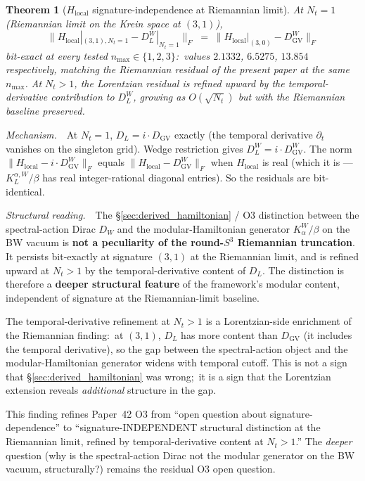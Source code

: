 \documentclass[11pt,a4paper]{article}
\theoremstyle{plain}
\newtheorem{theorem}{Theorem}[section]
\theoremstyle{definition}
\newcommand{\sthree}{S^{3}}
\begin{document}
\begin{theorem}[$H_{\mathrm{local}}$ signature-independence at Riemannian limit]
\label{thm:h_local_sig_independent}
At $N_t = 1$ (Riemannian limit on the Krein space at $(3, 1)$),
\[
\bigl\| H_{\mathrm{local}}|_{(3, 1), N_t = 1} - D_L^W|_{N_t = 1} \bigr\|_F
\;=\;
\bigl\| H_{\mathrm{local}}|_{(3, 0)} - D_{\mathrm{GV}}^W \bigr\|_F
\]
bit-exact at every tested $n_{\max} \in \{1, 2, 3\}$:\ values
$2.1332$, $6.5275$, $13.854$ respectively, matching the Riemannian
residual of the present paper at the same $n_{\max}$.  At $N_t > 1$,
the Lorentzian residual is refined upward by the temporal-derivative
contribution to $D_L^W$, growing as $O(\sqrt{N_t})$ but with the
Riemannian baseline preserved.
\end{theorem}

\emph{Mechanism.}\ \ At $N_t = 1$, $D_L = i \cdot D_{\mathrm{GV}}$
exactly (the temporal derivative $\partial_t$ vanishes on the
singleton grid).  Wedge restriction gives $D_L^W = i \cdot D_{\mathrm{GV}}^W$.
The norm $\|H_{\mathrm{local}} - i \cdot D_{\mathrm{GV}}^W\|_F$ equals
$\|H_{\mathrm{local}} - D_{\mathrm{GV}}^W\|_F$ when $H_{\mathrm{local}}$
is real (which it is — $K_L^{\alpha, W}/\beta$ has real integer-rational
diagonal entries).  So the residuals are bit-identical.

\emph{Structural reading.}\ \ The \S\ref{sec:derived_hamiltonian} /
O3 distinction between the spectral-action Dirac $D_W$ and the
modular-Hamiltonian generator $K_\alpha^W/\beta$ on the BW vacuum is
\textbf{not a peculiarity of the round-$\sthree$ Riemannian
truncation}.  It persists bit-exactly at signature $(3, 1)$ at the
Riemannian limit, and is refined upward at $N_t > 1$ by the
temporal-derivative content of $D_L$.  The distinction is therefore
a \textbf{deeper structural feature} of the framework's modular
content, independent of signature at the Riemannian-limit baseline.

The temporal-derivative refinement at $N_t > 1$ is a Lorentzian-side
enrichment of the Riemannian finding:\ at $(3, 1)$, $D_L$ has more
content than $D_{\mathrm{GV}}$ (it includes the temporal derivative),
so the gap between the spectral-action object and the
modular-Hamiltonian generator widens with temporal cutoff.  This is
not a sign that \S\ref{sec:derived_hamiltonian} was wrong;\ it is a
sign that the Lorentzian extension reveals \emph{additional}
structure in the gap.

This finding refines Paper~42 O3 from ``open question about
signature-dependence'' to ``signature-INDEPENDENT structural
distinction at the Riemannian limit, refined by temporal-derivative
content at $N_t > 1$.''  The \emph{deeper} question (why is the
spectral-action Dirac not the modular generator on the BW vacuum,
structurally?) remains the residual O3 open question.
\end{document}
